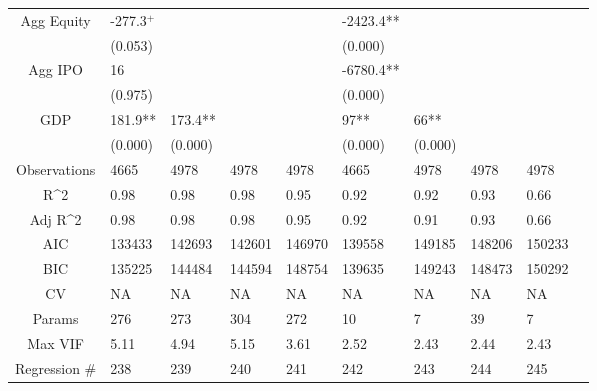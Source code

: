 \documentclass{article}
\begin{document}
\begin{table}[H]
\begin{tabular}{|clllllllll|}
  Agg Equity & -277.3$^{+}$ &  &  &  & -2423.4** &  &  &  & \\ 
   & (0.053) &  &  &  & (0.000) &  &  &  & \\ 
  Agg IPO & 16 &  &  &  & -6780.4** &  &  &  & \\ 
   & (0.975) &  &  &  & (0.000) &  &  &  & \\ 
  GDP & 181.9** & 173.4** &  &  & 97** & 66** &  &  & \\ 
   & (0.000) & (0.000) &  &  & (0.000) & (0.000) &  &  & \\ 
  \hline 
 Observations & 4665 & 4978 & 4978 & 4978 & 4665 & 4978 & 4978 & 4978 & \\ 
  R^2 & 0.98 & 0.98 & 0.98 & 0.95 & 0.92 & 0.92 & 0.93 & 0.66 & \\ 
  Adj R^2 & 0.98 & 0.98 & 0.98 & 0.95 & 0.92 & 0.91 & 0.93 & 0.66 & \\ 
  AIC & 133433 & 142693 & 142601 & 146970 & 139558 & 149185 & 148206 & 150233 & \\ 
  BIC & 135225 & 144484 & 144594 & 148754 & 139635 & 149243 & 148473 & 150292 & \\ 
  CV & NA & NA & NA & NA & NA & NA & NA & NA & \\ 
  Params & 276 & 273 & 304 & 272 & 10 & 7 & 39 & 7 & \\ 
  Max VIF & 5.11 & 4.94 & 5.15 & 3.61 & 2.52 & 2.43 & 2.44 & 2.43 & \\ 
  Regression \# & 238 & 239 & 240 & 241 & 242 & 243 & 244 & 245 & \\ 
   \hline
\end{tabular}
 
\end{table}
\end{document}
